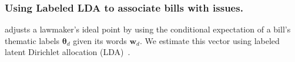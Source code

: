 



\subsubsection{Using Labeled LDA to associate bills with issues.}
\label{sec:lda}

 adjusts a lawmaker's ideal
point by using the conditional expectation of a bill's thematic labels
$\bm \theta_d$ given its words $\bm w_d$.  We estimate this vector
using labeled latent Dirichlet allocation (LDA)~\citep{ramage:2009}.

